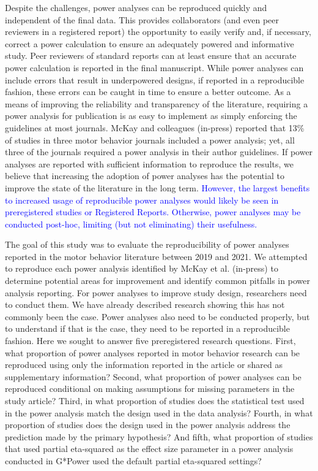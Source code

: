 \documentclass[
  man, donotrepeattitle,mask,floatsintext]{apa7}
\begin{document}
Despite the challenges, power analyses can be reproduced quickly and independent of the final data. This provides collaborators (and even peer reviewers in a registered report) the opportunity to easily verify and, if necessary, correct a power calculation to ensure an adequately powered and informative study. Peer reviewers of standard reports can at least ensure that an accurate power calculation is reported in the final manuscript. While power analyses can include errors that result in underpowered designs, if reported in a reproducible fashion, these errors can be caught in time to ensure a better outcome. As a means of improving the reliability and transparency of the literature, requiring a power analysis for publication is as easy to implement as simply enforcing the guidelines at most journals. McKay and colleagues (in-press) reported that 13\% of studies in three motor behavior journals included a power analysis; yet, all three of the journals required a power analysis in their author guidelines. If power analyses are reported with sufficient information to reproduce the results, we believe that increasing the adoption of power analyses has the potential to improve the state of the literature in the long term. \textcolor{blue}{However, the largest benefits to increased usage of reproducible power analyses would likely be seen in preregistered studies or Registered Reports. Otherwise, power analyses may be conducted post-hoc, limiting (but not eliminating) their usefulness.}

The goal of this study was to evaluate the reproducibility of power analyses reported in the motor behavior literature between 2019 and 2021. We attempted to reproduce each power analysis identified by McKay et al. (in-press) to determine potential areas for improvement and identify common pitfalls in power analysis reporting. For power analyses to improve study design, researchers need to conduct them. We have already described research showing this has not commonly been the case. Power analyses also need to be conducted properly, but to understand if that is the case, they need to be reported in a reproducible fashion. Here we sought to answer five preregistered research questions. First, what proportion of power analyses reported in motor behavior research can be reproduced using only the information reported in the article or shared as supplementary information? Second, what proportion of power analyses can be reproduced conditional on making assumptions for missing parameters in the study article? Third, in what proportion of studies does the statistical test used in the power analysis match the design used in the data analysis? Fourth, in what proportion of studies does the design used in the power analysis address the prediction made by the primary hypothesis? And fifth, what proportion of studies that used partial eta-squared as the effect size parameter in a power analysis conducted in G*Power used the default partial eta-squared settings?
\end{document}
